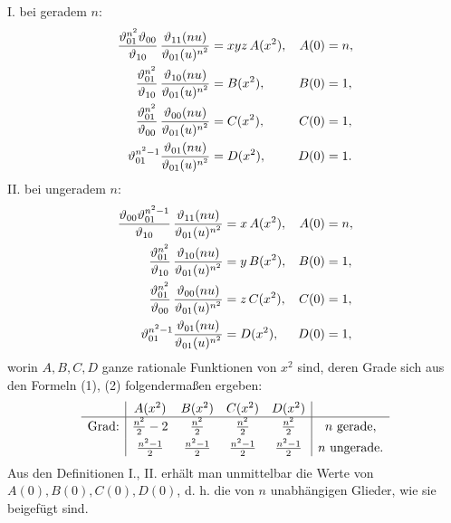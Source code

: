 \documentclass[11pt]{article}
\begin{document}
I. bei geradem $n$:
\begin{equation*}
\begin{aligned}
{\vartheta_{01}^{n^2}\vartheta_{00}\over\vartheta_{10}}\,
{\vartheta_{11}(nu)\over \vartheta_{01}(u)^{n^2}}&=xyz\,A(x^2),
& A(0)&=n,\\
{\vartheta_{01}^{n^2}\over\vartheta_{10}}\,
{\vartheta_{10}(nu)\over \vartheta_{01}(u)^{n^2}}&=B(x^2),
& B(0)&=1,\\
{\vartheta_{01}^{n^2}\over\vartheta_{00}}\,
{\vartheta_{00}(nu)\over \vartheta_{01}(u)^{n^2}}&=C(x^2),
& C(0)&=1,\\
\vartheta_{01}^{n^2-1}{\vartheta_{01}(nu)\over \vartheta_{01}(u)^{n^2}}&=D(x^2),
& D(0)&=1.
\end{aligned}
\end{equation*}
II. bei ungeradem $n$:
\begin{equation*}
\begin{aligned}
{\vartheta_{00}\vartheta_{01}^{n^2-1}\over\vartheta_{10}}\,
{\vartheta_{11}(nu)\over \vartheta_{01}(u)^{n^2}}&=x\,A(x^2),
& A(0)&=n,\\
{\vartheta_{01}^{n^2}\over\vartheta_{10}}\,
{\vartheta_{10}(nu)\over \vartheta_{01}(u)^{n^2}}&=y\,B(x^2),
& B(0)&=1,\\
{\vartheta_{01}^{n^2}\over\vartheta_{00}}\,
{\vartheta_{00}(nu)\over \vartheta_{01}(u)^{n^2}}&=z\,C(x^2),
& C(0)&=1,\\
\vartheta_{01}^{n^2-1}{\vartheta_{01}(nu)\over \vartheta_{01}(u)^{n^2}}&=D(x^2),
& D(0)&=1,
\end{aligned}
\end{equation*}
worin $A,B,C,D$ ganze rationale Funktionen von $x^2$ sind, deren Grade sich aus den
Formeln (1), (2) folgendermaßen ergeben:
\[
\begin{array}{c|cccc|c}
 & A(x^2)&B(x^2)&C(x^2)&D(x^2)&\\ \hline
\text{Grad:}&{n^2\over2}-2&{n^2\over2}&{n^2\over2}&{n^2\over2}&n\ \text{gerade},\\[0.3em]
&{n^2-1\over2}&{n^2-1\over2}&{n^2-1\over2}&{n^2-1\over2}&n\ \text{ungerade}.
\end{array}
\]
Aus den Definitionen I., II. erhält man unmittelbar die Werte von $A(0),B(0),C(0),D(0)$,
d. h. die von $n$ unabhängigen Glieder, wie sie beigefügt sind.
\end{document}
